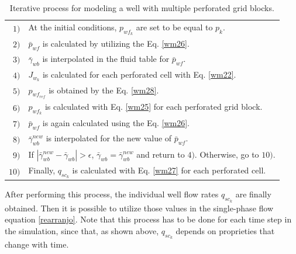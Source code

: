 \begin{table}[htbp]
	\centering
	\caption{Iterative process for modeling a well with multiple perforated grid blocks.}
	\begin{tabular}{r l}
		\toprule
		$1)$ & At the initial conditions, $p_{wf_{k}}$ are set to be equal to $p_k$. \\
		$2)$ & $\bar{p}_{wf}$ is calculated by utilizing the Eq. \ref{wm26}. \\
		$3)$ & $\bar{\gamma}_{wb}$ is interpolated in the fluid table for $\bar{p}_{wf}$.\\
		$4)$ & $J_{w_k}$ is calculated for each perforated cell with Eq. \ref{wm22}.\\
		$5)$ & $p_{wf_{ref}}$ is obtained by the Eq. \ref{wm28}.\\
		$6)$ & $p_{wf_{k}}$ is calculated with Eq. \ref{wm25} for each perforated grid block.\\
		$7)$ & $\bar{p}_{wf}$ is again calculated using the Eq. \ref{wm26}. \\
		$8)$ & $\bar{\gamma}_{wb}^{new}$ is interpolated for the new value of $\bar{p}_{wf}$.\\
		$9)$ & If $|\bar{\gamma}_{wb}^{new} - \bar{\gamma}_{wb}| > \epsilon$, $\bar{\gamma}_{wb} = \bar{\gamma}_{wb}^{new}$ and return to $4)$. Otherwise, go to $10)$.\\
		$10)$ & Finally, $q_{{sc}_k}$ is calculated with Eq. \ref{wm27} for each perforated cell.\\
		\bottomrule
	\end{tabular}
	\label{tbl:4}
\end{table}
After performing this process, the individual well flow rates $q_{sc_k}$ are finally obtained. Then it is possible to utilize those values in the single-phase flow equation \ref{rearranjo}. Note that this process has to be done for each time step in the simulation, since that, as shown above, $q_{sc_k}$ depends on proprieties that change with time.

